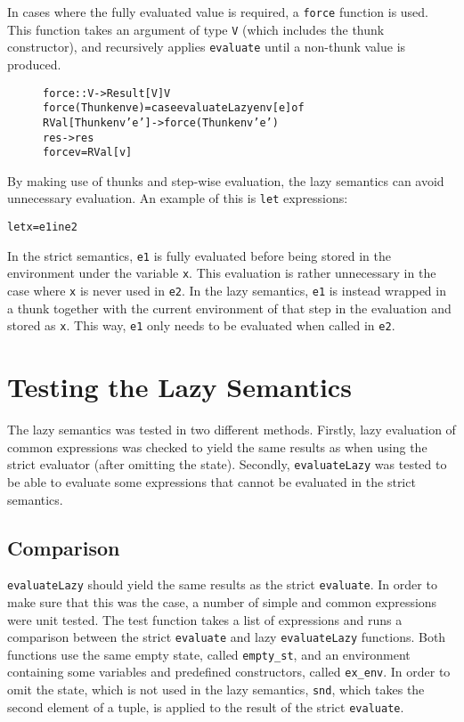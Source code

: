 In cases where the fully evaluated value is required, a \texttt{force} function is used.
This function takes an argument of type \texttt{V} (which includes the thunk constructor),
and recursively applies \texttt{evaluate} until a non-thunk value is produced.

\begin{figure}[!ht]
\begin{alltt}
force :: V -> Result [V] V
force (Thunk env e) = case evaluateLazy env [e] of
  RVal [Thunk env' e'] -> force (Thunk env' e')
  res -> res
force v = RVal [v]
\end{alltt}
\end{figure}

By making use of thunks and step-wise evaluation, the lazy semantics can avoid unnecessary
evaluation. An example of this is \texttt{let} expressions:
\begin{alltt}
  let x = e1 in e2
\end{alltt}
In the strict semantics, \texttt{e1} is fully evaluated before being stored in the
environment under the variable \texttt{x}. 
This evaluation is rather unnecessary in the case where \texttt{x} is never used in
\texttt{e2}. In the lazy semantics, \texttt{e1} is instead wrapped in a thunk together with
the current environment of that step in the evaluation and stored as \texttt{x}. This way,
\texttt{e1} only needs to be evaluated when called in \texttt{e2}.

\section{Testing the Lazy Semantics}
\label{LazySemTest}
The lazy semantics was tested in two different methods.
Firstly, lazy evaluation of common
expressions was checked to yield the same results as when using the strict
evaluator (after omitting the state). Secondly, \texttt{evaluateLazy}
was tested to be able to evaluate some expressions that cannot be evaluated
in the strict semantics.

\subsection{Comparison}
\texttt{evaluateLazy} should yield the same results as the strict
\texttt{evaluate}. In order to make sure that this was the case, a number of
simple and common expressions were unit tested.
The test function takes a list of expressions and runs a comparison between the
strict \texttt{evaluate} and lazy \texttt{evaluateLazy} functions.
Both functions use the same empty state, called \texttt{empty\_st}, and
an environment containing some variables and predefined constructors,
called \texttt{ex\_env}. In order to omit the state, which is not used in
the lazy semantics, \texttt{snd}, which takes the second element of a tuple,
is applied to the result of the strict \texttt{evaluate}.

